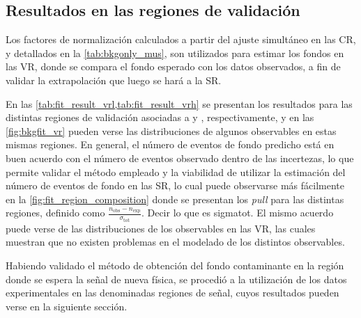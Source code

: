 







\subsection{Resultados en las regiones de validación}

Los factores de normalización calculados a partir del ajuste simultáneo en las
CR, y detallados en la \cref{tab:bkgonly_mus}, son utilizados para estimar los fondos
en las VR, donde se compara el fondo esperado con los datos observados, a fin de
validar la extrapolación que luego se hará a la SR.

En las \cref{tab:fit_result_vrl,tab:fit_result_vrh} se presentan los resultados
para las distintas regiones de validación asociadas a {\SRL} y {\SRH},
respectivamente, y en las \cref{fig:bkgfit_vr} pueden verse las distribuciones
de algunos observables en estas mismas regiones. En general, el número de
eventos de fondo predicho está en buen acuerdo con el número de eventos
observado dentro de las incertezas, lo que permite validar el método empleado y
la viabilidad de utilizar la estimación del número de eventos de fondo en las
SR, lo cual puede observarse más fácilmente en la
\cref{fig:fit_region_composition} donde se presentan los \emph{pull} para las
distintas regiones, definido como $\frac{n_\text{obs} - n_\text{exp}}{\sigma_\text{tot}}$.
Decir lo que es sigmatot.
El mismo acuerdo puede verse de las distribuciones de los
observables en las VR, las cuales muestran que no existen problemas en el
modelado de los distintos observables.

Habiendo validado el método de obtención del fondo contaminante en la región
donde se espera la señal de nueva física, se procedió a la utilización de los
datos experimentales en las denominadas regiones de señal, cuyos resultados
pueden verse en la siguiente sección.



